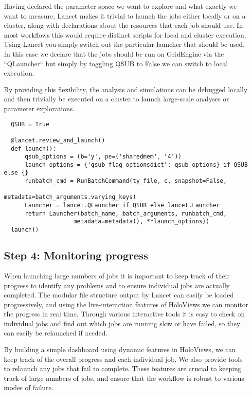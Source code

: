 Having declared the parameter space we want to explore and what
exactly we want to measure, Lancet makes it trivial to launch the jobs
either locally or on a cluster, along with declarations about the
resources that each job should use. In most workflows this would
require distinct scripts for local and cluster execution. Using Lancet
you simply switch out the particular launcher that should be used. In
this case we declare that the jobs should be run on GridEngine via the
``QLauncher`` but simply by toggling QSUB to False we can switch to
local execution.

By providing this flexibility, the analysis and simulations can be
debugged locally and then trivially be executed on a cluster to launch
large-scale analyses or parameter explorations.

\begin{minipage}{\linewidth}
\begin{lstlisting}
  QSUB = True

  @lancet.review_and_launch()
  def launch():
      qsub_options = (b='y', pe=('sharedmem', '4'))
      launch_options = {'qsub_flag_optionsdict': qsub_options} if QSUB else {}
      runbatch_cmd = RunBatchCommand(ty_file, c, snapshot=False,
                                     metadata=batch_arguments.varying_keys)
      Launcher = lancet.QLauncher if QSUB else lancet.Launcher
      return Launcher(batch_name, batch_arguments, runbatch_cmd,
                    metadata=metadata(), **launch_options))
  launch()
\end{lstlisting}
\end{minipage}

\subsection{Step 4: Monitoring progress}

When launching large numbers of jobs it is important to keep track of
their progress to identify any problems and to ensure individual jobs
are actually completed. The modular file structure output by Lancet
can easily be loaded progressively, and using the live-interaction
features of HoloViews we can monitor the progress in real
time. Through various interactive tools it is easy to check on
individual jobs and find out which jobs are running slow or have
failed, so they can easily be relaunched if needed.

By building a simple dashboard using dynamic features in HoloViews, we
can keep track of the overall progress and each individual job.
We also provide tools to relaunch any jobs that fail to
complete. These features are crucial to keeping track of large numbers
of jobs, and ensure that the workflow is robust to various modes of
failure.


